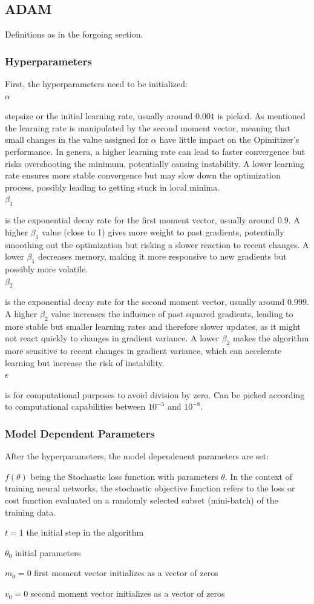 \documentclass[oneside]{article}
\begin{document}
\subsection{ADAM}
Definitions as in the forgoing section.
\subsubsection{Hyperparameters}
First, the hyperparameters need to be initialized:\\
$\alpha$ \par 
stepsize or the initial learning rate, usually around $0.001$ is picked. As mentioned the learning rate is manipulated by the second moment vector, meaning that small changes in the value assigned for $\alpha$ have little impact on the Opimitizer's performance. In genera, a higher learning rate can lead to faster convergence but risks overshooting the minimum, potentially causing instability. A lower learning rate ensures more stable convergence but may slow down the optimization process, possibly leading to getting stuck in local minima.\\
$\beta_1$\par 
is the exponential decay rate for the first moment vector, usually around $0.9$. A higher \(\beta_1\) value (close to 1) gives more weight to past gradients, potentially smoothing out the optimization but risking a slower reaction to recent changes. A lower \(\beta_1\) decreases memory, making it more responsive to new gradients but possibly more volatile.\\
$\beta_2$\par
is the exponential decay rate for the second moment vector, usually around $0.999$. A higher \(\beta_2\) value increases the influence of past squared gradients, leading to more stable but smaller learning rates and therefore slower updates, as it might not react quickly to changes in gradient variance. A lower \(\beta_2\) makes the algorithm more sensitive to recent changes in gradient variance, which can accelerate learning but increase the risk of instability.\\
$\epsilon$ \par
is for computational purposes to avoid division by zero. Can be picked according to computational capabilities between $10^{-5}$ and $10^{-8}$.

\subsubsection{Model Dependent Parameters}
After the hyperparameters, the model dependenent parameters are set:\par
$f(\theta)$ being the Stochastic loss function with parameters $\theta$. In the context of training neural networks, the stochastic objective function refers to the loss or cost function evaluated on a randomly selected subset (mini-batch) of the training data.\par
$t=1$ the initial step in the algorithm\par
$\theta_0$ initial parameters\par
$m_0=0$ first moment vector initializes as a vector of zeros\par
$v_0=0$ second moment vector initializes as a vector of zeros
\end{document}
